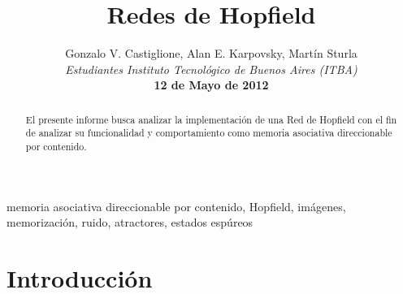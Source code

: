 \documentclass[%
    final,
    reprint,
    notitlepage,
    narroweqnarray,
    inline,
    twoside,
    invited
    ]{ieee}
\begin{document}
\title[Redes de Hopfield]{%
       Redes de Hopfield}

\author[Castiglione, Karpovsky, Sturla]{Gonzalo V. Castiglione, Alan E. Karpovsky, Martín Sturla\\\textit{Estudiantes 
       Instituto Tecnológico de Buenos Aires (ITBA)}\\
\textbf{12 de Mayo de 2012}
}


\lognumber{}
\pubitemident{}


\maketitle               

\begin{abstract} 
El presente informe busca analizar la implementación de una Red de Hopfield con el fin de analizar su funcionalidad y comportamiento como memoria asociativa direccionable por contenido.
\end{abstract}

\begin{keywords}
memoria asociativa direccionable por contenido, Hopfield, imágenes, memorización, ruido, atractores, estados espúreos
\end{keywords}

\section{Introducción}
\end{document}
